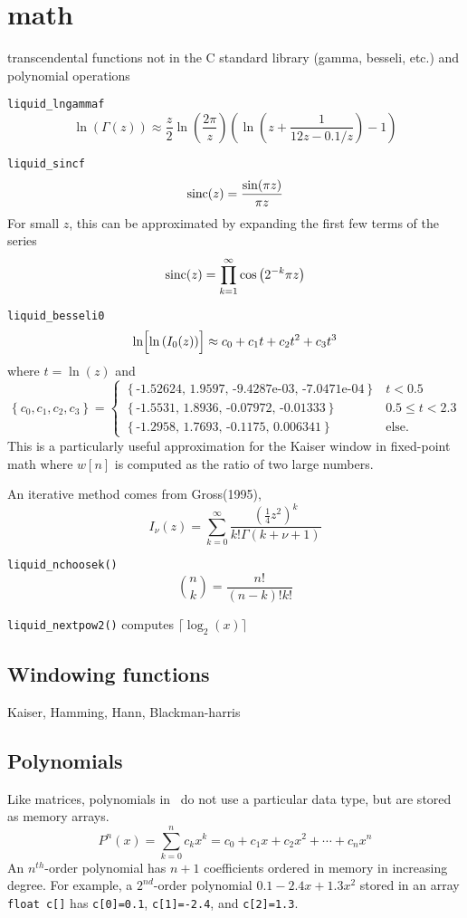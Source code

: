 % 
%

\section{math}
\label{module:math}
transcendental functions not in the C standard library (gamma, besseli, etc.)
and polynomial operations

{\tt liquid\_lngammaf}
\[
    \ln(\Gamma(z)) \approx
    \frac{z}{2} \ln\left( \frac{2\pi}{z} \right)
    \left(
        \ln\left(z + \frac{1}{12 z - 0.1/z} \right) - 1
    \right)
\]

{\tt liquid\_sincf}
\[ \textup{sinc}(z) = \frac{\sin(\pi z)}{\pi z} \]
For small $z$, this can be approximated by expanding the first few terms of
the series
\[
    \textup{sinc}(z) = \prod_{k=1}^{\infty}{ \cos\left( 2^{-k} \pi z \right) }
\]

{\tt liquid\_besseli0}
\[
    \ln\Bigl[\ln\left(I_0(z)\right)\Bigr] \approx
    c_0 + c_1 t + c_2 t ^2 + c_3 t^3
\]
where $t=\ln(z)$ and
\[
    \left\{c_0,c_1,c_2,c_3\right\} =
    \begin{cases}
    \left\{\text{-1.52624, 1.9597, -9.4287e-03, -7.0471e-04}\right\} & t < 0.5 \\
    \left\{\text{-1.5531, 1.8936, -0.07972, -0.01333}\right\} & 0.5 \le t < 2.3 \\
    \left\{\text{-1.2958, 1.7693, -0.1175, 0.006341}\right\} & \text{else}.
    \end{cases}
\]
This is a particularly useful approximation for the Kaiser window in
fixed-point math where $w[n]$ is computed as the ratio of two large numbers.

An iterative method comes from Gross(1995),
\[
    I_\nu(z) = \sum_{k=0}^{\infty}{\frac{\left(\frac{1}{4}z^2\right)^k}{k!\Gamma(k+\nu+1)}}
\]

{\tt liquid\_nchoosek()}
\[
    {n \choose k} = \frac{n!}{(n-k)!k!}
\]

{\tt liquid\_nextpow2()} computes $\lceil \log_2(x) \rceil$

\subsection{Windowing functions}
Kaiser, Hamming, Hann, Blackman-harris

\subsection{Polynomials}
Like matrices, polynomials in \liquid\ do not use a particular data type, but
are stored as memory arrays.
\[
    P^n(x) = \sum_{k=0}^{n}{c_k x^k}
           = c_0 + c_1 x + c_2 x^2 + \cdots + c_n x^n
\]
An $n^{th}$-order polynomial has $n+1$ coefficients ordered in memory in
increasing degree.
For example, a $2^{nd}$-order polynomial $0.1 -2.4x + 1.3x^2$ stored in an
array {\tt float c[]} has
{\tt c[0]=0.1},
{\tt c[1]=-2.4}, and
{\tt c[2]=1.3}.


